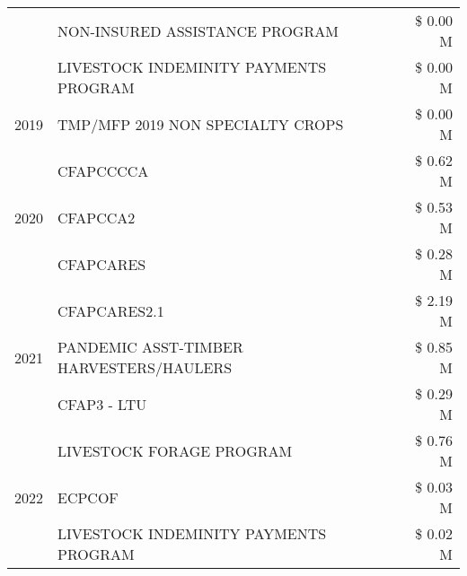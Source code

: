 \begin{tabular}{llr}
 & NON-INSURED ASSISTANCE PROGRAM & \$ 0.00 M \\
 & LIVESTOCK INDEMINITY PAYMENTS PROGRAM & \$ 0.00 M \\
\cline{1-3}
2019 & TMP/MFP 2019 NON SPECIALTY CROPS & \$ 0.00 M \\
\cline{1-3}
\multirow[t]{3}{*}{2020} & CFAPCCCCA & \$ 0.62 M \\
 & CFAPCCA2 & \$ 0.53 M \\
 & CFAPCARES & \$ 0.28 M \\
\cline{1-3}
\multirow[t]{3}{*}{2021} & CFAPCARES2.1 & \$ 2.19 M \\
 & PANDEMIC ASST-TIMBER HARVESTERS/HAULERS & \$ 0.85 M \\
 & CFAP3 - LTU & \$ 0.29 M \\
\cline{1-3}
\multirow[t]{3}{*}{2022} & LIVESTOCK FORAGE PROGRAM & \$ 0.76 M \\
 & ECPCOF & \$ 0.03 M \\
 & LIVESTOCK INDEMINITY PAYMENTS PROGRAM & \$ 0.02 M \\
\cline{1-3}
\bottomrule
\end{tabular}
